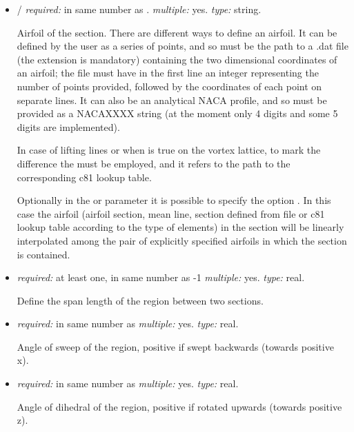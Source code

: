 \begin{itemize}
  Angle of twist, in degrees, of the airfoil section.

  \item {}/ \textit{required:} in same number as 
  . \textit{multiple:} yes. \textit{type:} string.

  Airfoil of the section. There are different ways to define an airfoil. It can be defined by the user as a 
  series of points, and so  must be the path to a .dat file (the extension is mandatory) 
  containing the two dimensional coordinates of an airfoil; the file must have in the first line an integer 
  representing the number of points provided, followed by the coordinates of each point on separate lines. 
  It can also be an analytical NACA profile, and so must be provided as a 
  NACAXXXX string (at the moment only 4 digits and some 5 digits are implemented). 

  In case of lifting lines or when  is true on the vortex lattice, to mark 
  the difference the  must be employed, and it refers to the path to the corresponding c81 lookup table. 

  Optionally in the  or  parameter it is possible to specify the option 
  . In this case the airfoil (airfoil section, mean line, section defined from file or c81 lookup 
  table according to the type of elements) in the section will be linearly interpolated among the pair of 
  explicitly specified airfoils in which the section is contained. 

  \item {} \textit{required:} at least one, in same number as -1 \textit{multiple:} yes. \textit{type:} real.

  Define the span length of the region between two sections.  

  \item {} \textit{required:} in same number as  \textit{multiple:} yes. \textit{type:} real.

  Angle of sweep of the region, positive if swept backwards (towards positive x).

  \item {} \textit{required:} in same number as  \textit{multiple:} yes. \textit{type:} real.

  Angle of dihedral of the region, positive if rotated upwards (towards positive z).


\end{itemize}
